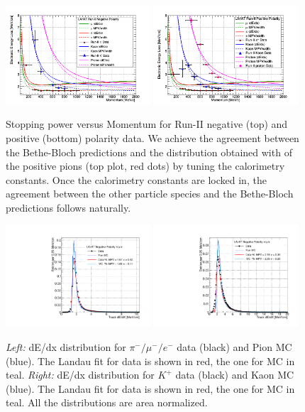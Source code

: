 \begin{figure}[htb]
\centering
\includegraphics[width=0.48\textwidth]{Chapter-5/Images/RunIINegTotaldEdXvsMomentum.png}
\includegraphics[width=0.48\textwidth]{Chapter-5/Images/RunIIPosTotaldEdXvsMomentum.png}
\caption{Stopping power versus Momentum for Run-II negative (top) and positive (bottom) polarity data. We achieve the agreement between the Bethe-Bloch predictions and the distribution obtained with of the positive pions (top plot, red dots) by tuning the calorimetry constants. Once the calorimetry constants are locked in, the agreement between the other particle species and the Bethe-Bloch predictions follows naturally.}
\label{fig:BBandData}
\end{figure}


\begin{figure}[htb]
\centering
\includegraphics[width=0.48\textwidth]{AppendixC-EnergyCalibration/dEdXPions.pdf}
\includegraphics[width=0.48\textwidth]{AppendixC-EnergyCalibration/dEdXKaons.pdf}
\caption{\emph{Left:} dE/dx distribution for $\pi^-/\mu^-/e^-$ data (black) and Pion MC (blue). The Landau fit for data is shown in red, the one for MC in teal. \emph{Right:} dE/dx distribution for $K^+$ data (black) and Kaon MC (blue). The Landau fit for data is shown in red, the one for MC in teal. All the distributions are area normalized.}
\label{fig:dedx}
\end{figure}


